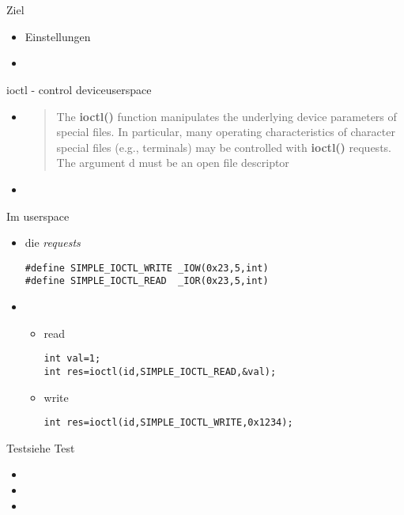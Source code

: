 \section{}
\begin{frame}{Ziel}{}
 \begin{itemize}
  \item Einstellungen
  \item {}
 \end{itemize}
\end{frame}

\begin{frame}{ioctl - control device}{userspace}
\begin{itemize}
 \item {}
\begin{quote}
{\footnotesize
The  {\bf ioctl()} function manipulates the underlying device parameters of special
files.  In particular, many operating characteristics of character special files
(e.g., terminals) may be controlled with {\bf ioctl()} requests.  The argument d
must be an open file descriptor
}
\end{quote}
 \item {}
\end{itemize}
\end{frame}

\begin{frame}[fragile]{Im userspace}{}
\begin{itemize}
 \item die {\em requests} 
 \begin{lstlisting}
#define SIMPLE_IOCTL_WRITE _IOW(0x23,5,int)  
#define SIMPLE_IOCTL_READ  _IOR(0x23,5,int) 
 \end{lstlisting}
 \item {}
 \begin{itemize}
  \item read
  \vspace{-2mm}
  \begin{lstlisting}
int val=1;
int res=ioctl(id,SIMPLE_IOCTL_READ,&val);
  \end{lstlisting}
  \item write
  \vspace{-2mm}
  \begin{lstlisting}
int res=ioctl(id,SIMPLE_IOCTL_WRITE,0x1234);
  \end{lstlisting}
 \end{itemize}
\end{itemize}
\end{frame}

\begin{frame}{Test}{siehe  Test}
 \begin{itemize}
  \item {}
  \item {}
  \item {}
 \end{itemize}
\end{frame}
